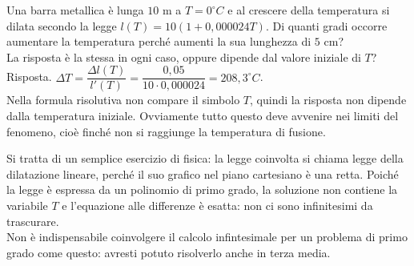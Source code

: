 \begin{esempio}
 Una barra metallica è lunga $10$ m a $T=0 ^\circ C$ e al crescere della 
 temperatura si dilata secondo la legge $l(T)=10(1+0,000024T)$. Di quanti 
gradi 
 occorre aumentare la temperatura perché aumenti la sua lunghezza di $5$ 
cm?\\
 La risposta è la stessa in ogni caso, oppure dipende dal valore iniziale 
di 
 $T$?\\
 Risposta. $\Delta T = \dfrac{\Delta l(T)}{l'(T)}=\dfrac{0,05}
 {10\cdot 0,000024}=208,3 ^\circ C$.\\
 Nella formula risolutiva non compare il simbolo $T$, quindi la risposta 
non 
 dipende dalla temperatura iniziale. Ovviamente tutto questo deve avvenire 
nei 
 limiti del fenomeno, cioè finché non si raggiunge la temperatura di 
fusione.
 \begin{osservazione}
  Si tratta di un semplice esercizio di fisica: la legge coinvolta si chiama
  legge della dilatazione lineare, perché il suo grafico nel piano 
cartesiano 
  è una retta. Poiché la legge è espressa da un polinomio di primo grado, 
la 
  soluzione non contiene la variabile $T$ e l'equazione alle differenze è
  esatta: non ci sono infinitesimi da trascurare.\\
  Non è indispensabile coinvolgere il calcolo infintesimale per un problema 
di
  primo grado come questo: avresti potuto risolverlo anche in terza media.
 \end{osservazione}
\end{esempio}

